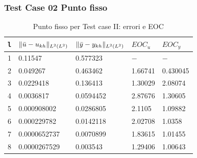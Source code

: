 \documentclass{beamer}
\theoremstyle{definition}
\theoremstyle{remark}
\theoremstyle{plain}
\theoremstyle{definition}
\DeclarePairedDelimiter{\norma}{\lVert}{\rVert}
\begin{document}
\begin{frame}
\end{frame}

\begin{frame}
\frametitle{Test Case 02 Punto fisso}

\begin{table}
\caption{Punto fisso per Test case II: errori e EOC }
\label{puntofissoII}
\centering

\begin{tabular}{cllll}
\toprule
{\texttt{l}}           &  {$ \norma{\bar{u}-u_{kh}}_{L^2(L^2)} $} &  {$ \norma{\bar{y}-y_{kh}}_{L^2(L^2)} $} &  {$ EOC_{u} $} &  {$ EOC_y $} \\
\midrule
1            &  0.11547 &  0.577323 &  {$-$} &  {$-$} \\
2            &  0.049267 &  0.463462 &  1.66741 &  0.430045 \\
3            &  0.0229418 &  0.136413 &  1.30029 &  2.08074 \\
4            &  0.0036817 &  0.0594452 &  2.87676 &  1.30605 \\
5            &  0.000908002 &  0.0286805 &  2.1105 &  1.09882 \\
6            &  0.000229782  &  0.0142118 &  2.02708 &  1.0358 \\
7            &  0.0000652737 &  0.0070899 &  1.83615 &  1.01455 \\      
8            &  0.0000267529 &  0.003543 &  1.29406 &  1.00643 \\
\bottomrule
\end{tabular}              

\end{table}


\end{frame}
\end{document}
